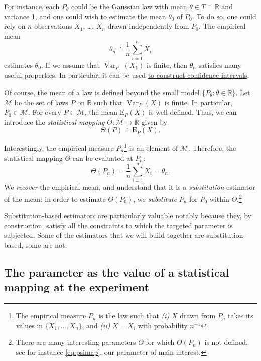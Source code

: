 \documentclass[11pt,openright,twoside]{book}
\DeclareMathOperator{\Var}{Var}
\newcommand{\bbR}{\mathbb{R}}
\newcommand{\defq}{\doteq}
\newcommand{\calM}{\mathcal{M}}
\newcommand{\Exp}{\textrm{E}}
\theoremstyle{definition}
\theoremstyle{definition}
\theoremstyle{definition}
\theoremstyle{remark}
\begin{document}
For instance, each \(P_{\theta}\) could be the Gaussian law with mean \(\theta \in T \defq \bbR\) and variance 1, and one could wish to estimate the mean
\(\theta_{0}\) of \(P_{0}\). To do so, one could rely on \(n\) observations \(X_{1}\),
\ldots, \(X_{n}\) drawn independently from \(P_{0}\). The empirical mean
\begin{equation*}\theta_{n}       \defq      \frac{1}{n}       \sum_{i=1}^{n}
X_{i}\end{equation*} estimates \(\theta_{0}\). If we assume that \(\Var_{P_{0}} (X_{1})\) is finite, then \(\theta_{n}\) satisfies many useful properties. In
particular, it can be used \protect\hyperlink{clt}{to construct confidence intervals}.

Of course, the mean of a law is defined beyond the small model \(\{P_{\theta} : \theta \in \bbR\}\). Let \(\calM\) be the set of laws \(P\) on \(\bbR\) such that
\(\Var_{P}(X)\) is finite. In particular, \(P_{0} \in \calM\). For every \(P \in \calM\), the mean \(\Exp_{P}(X)\) is well defined. Thus, we can introduce the
\emph{statistical mapping} \(\Theta : \calM \to \bbR\) given by
\begin{equation*}\Theta(P) \defq \Exp_{P}(X).\end{equation*}

Interestingly, the empirical measure \(P_{n}\)\footnote{The empirical measure \(P_{n}\) is
  the law such that \emph{(i)} \(X\) drawn from \(P_{n}\) takes its values in \(\{X_{1}, \ldots, X_{n}\}\), and \emph{(ii)} \(X=X_{i}\) with probability \(n^{-1}\)} is an
element of \(\calM\). Therefore, the statistical mapping \(\Theta\) can be
evaluated at \(P_{n}\): \begin{equation*}\Theta(P_{n})    =   \frac{1}{n}
\sum_{i=1}^{n} X_{i}  = \theta_{n}.\end{equation*} We \emph{recover} the empirical
mean, and understand that it is a \emph{substitution} estimator of the mean: in
order to estimate \(\Theta(P_{0})\), we \emph{substitute} \(P_{n}\) for \(P_{0}\) within
\(\Theta\).\footnote{There are many interesting parameters \(\Theta\) for which
  \(\Theta(P_n)\) is not defined, see for instance \eqref{eq:psimap}, our parameter
  of main interest.}

Substitution-based estimators are particularly valuable notably because they,
by construction, satisfy all the constraints to which the targeted parameter
is subjected. Some of the estimators that we will build together are
substitution-based, some are not.

\hypertarget{parameter-mapping}{%
\subsection{The parameter as the value of a statistical mapping at the experiment}\label{parameter-mapping}}
\end{document}
